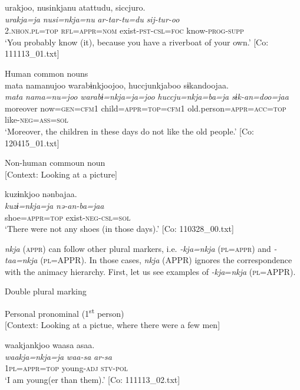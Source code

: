 {\TM}
\glll urakjoo,  nusinkjanu  atattudu,    siccjuro.\\
      \textit{urakja=ja}  \textit{nusi=nkja=nu}  \textit{ar-tar-tu=du}    \textit{sij-tur-oo}\\
      2.\textsc{nhon}.\textsc{pl}=\textsc{top}  \textsc{rfl}=\textsc{appr}=\textsc{nom}  exist-\textsc{pst}-\textsc{csl}=\textsc{foc}      know-\textsc{prog}-\textsc{supp}\\
\glt ‘You probably know (it), because you have a riverboat of your own.’ [Co: 111113\_01.txt]

\ex Human common nouns\\
{\TM}
\glll  mata  namanujoo  warabɨnkjoojoo,   huccjunkjaboo  sɨkandoojaa.\\
\textit{mata}  \textit{nama=nu=joo}  \textit{warabɨ=nkja=ja=joo}  \textit{huccju=nkja=ba=ja}  \textit{sɨk-an=doo=jaa}\\
moreover  now=\textsc{gen}=\textsc{cfm}1  child=\textsc{appr}=\textsc{top}=\textsc{cfm1}      old.person=\textsc{appr}=\textsc{acc}=\textsc{top}  like-\textsc{neg}=\textsc{ass}=\textsc{sol}\\
\glt ‘Moreover, the children in these days do not like the old people.’ [Co: 120415\_01.txt]

\ex Non-human commoun noun\\{}
[Context: Looking at a picture]

{\TM}
\glll kuzɨnkjoo  nənbajaa.\\
      \textit{kuzɨ=nkja=ja}  \textit{nə-an-ba=jaa}\\
      shoe=\textsc{appr}=\textsc{top}  exist-\textsc{neg}-\textsc{csl}=\textsc{sol}\\
\glt ‘There were not any shoes (in those days).’ [Co: 110328\_00.txt]
\z
\z

  \textit{nkja} (\textsc{appr}) can follow other plural markers, i.e. \textit{-kja=nkja} (\textsc{pl}=\textsc{appr}) and \textit{-taa=nkja} (\textsc{pl}=APPR). In those cases, \textit{nkja} (APPR) ignores the correspondence with the animacy hierarchy. First, let us see examples of \textit{-kja}=\textit{nkja} (\textsc{pl}=APPR).

\ea\label{ex:6-102}
  Double plural marking

 \ea Personal pronominal (1\textsuperscript{st} person)\\{}
[Context: Looking at a pictue, where there were a few men]

{\TM}
\glll waakjankjoo  waasa  asaa.\footnotemark\\
      \textit{waakja=nkja=ja}  \textit{waa-sa}  \textit{ar-sa}\\
      1\textsc{pl}=\textsc{appr}=\textsc{top}  young-\textsc{adj}  \textsc{stv}-\textsc{pol}\\
\glt ‘I am young(er than them).’ [Co: 111113\_02.txt]

